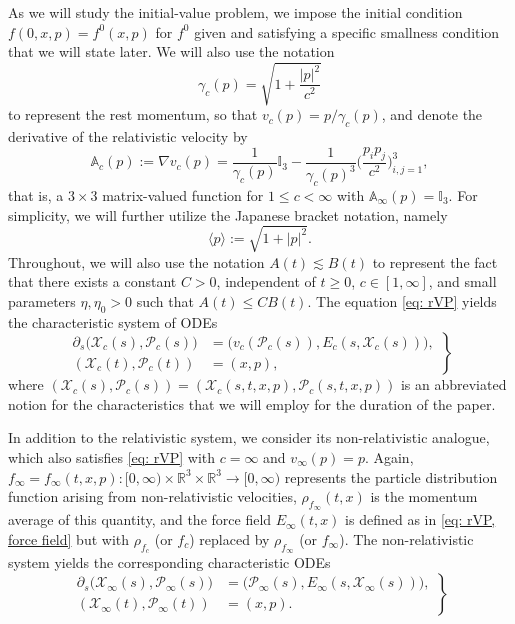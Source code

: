 \documentclass[reqno, 11pt, letterpaper]{amsart}
\theoremstyle{remark}
\numberwithin{equation}{section}
\numberwithin{theorem}{section}
\numberwithin{table}{section}
\numberwithin{figure}{section}
\begin{document}
As we will study the initial-value problem, we impose the initial condition
$f(0,x,p) = f^0(x,p)$
for $f^0$ given and satisfying a specific smallness condition that we will state later.
%
We will also use the notation
$$\gamma_c(p) = \sqrt{1 + \frac{|p|^2}{c^2}}$$
to represent the rest momentum, so that $v_c(p) = p/\gamma_c(p)$, and 
denote the derivative of the relativistic velocity by 
\begin{equation}
\label{Adef}
    \mathbb{A}_c(p):=\nabla v_c(p)=\frac{1}{\gamma_c(p)}\mathbb{I}_3-\frac{1}{\gamma_c(p)^3}\bigg(\frac{p_i p_j}{c^2}\bigg)_{i,j=1}^3,
\end{equation}
that is, a $3\times 3$ matrix-valued function for $1 \leq c < \infty$ with $\mathbb{A}_\infty(p) = \mathbb{I}_3$. 
For simplicity, we will further utilize the Japanese bracket notation, namely
$$\langle p \rangle := \sqrt{1 + |p|^2}.$$
Throughout, we will also use the notation
$A(t) \lesssim B(t)$
to represent the fact that there exists a constant $C > 0$, independent of $t \geq 0$, $c\in [1,\infty]$, and small parameters $\eta, \eta_0 > 0$ such that $A(t) \leq C B(t).$
%
The equation \eqref{eq: rVP} yields the characteristic system of ODEs 
\begin{equation}\label{eq: rVP-ODE}
\left.
\begin{aligned}
\partial_s\big(\mathcal{X}_c(s),\mathcal{P}_c(s)\big)&=\Bigg(v_c\left (\mathcal{P}_c(s)\right ),E_c(s,\mathcal{X}_c(s))\Bigg),\\
(\mathcal{X}_c(t),\mathcal{P}_c(t))&=(x,p),
\end{aligned}
\right \}
\end{equation}
where $(\mathcal{X}_c(s), \mathcal{P}_c(s))=(\mathcal{X}_c(s,t,x,p), \mathcal{P}_c(s,t,x,p))$ is an abbreviated notion for the characteristics that we will employ for the duration of the paper.

In addition to the relativistic system, we consider its non-relativistic analogue, which also satisfies \eqref{eq: rVP} with $c = \infty$ and $v_\infty(p) = p$. Again, $f_\infty=f_\infty(t,x,p): [0,\infty)\times\mathbb{R}^3\times\mathbb{R}^3\to [0,\infty)$ represents the particle distribution function arising from non-relativistic velocities,
$\rho_{f_\infty}(t,x)$ is the momentum average of this quantity, and the force field $E_\infty(t,x)$ is defined as in \eqref {eq: rVP, force field} but with $\rho_{f_c}$ (or $f_c$) replaced by $\rho_{f_\infty}$ (or $f_\infty$).
The non-relativistic system yields the corresponding characteristic ODEs 
\begin{equation}\label{eq: VP-ODE}
\left.
\begin{aligned}
\partial_s\big(\mathcal{X}_\infty(s),\mathcal{P}_\infty (s)\big)&=\Bigg(\mathcal{P}_\infty(s),E_\infty(s,\mathcal{X}_\infty(s))\Bigg),\\
(\mathcal{X}_\infty(t),\mathcal{P}_\infty(t))&=(x,p).
\end{aligned}
\right \}
\end{equation}
\end{document}
